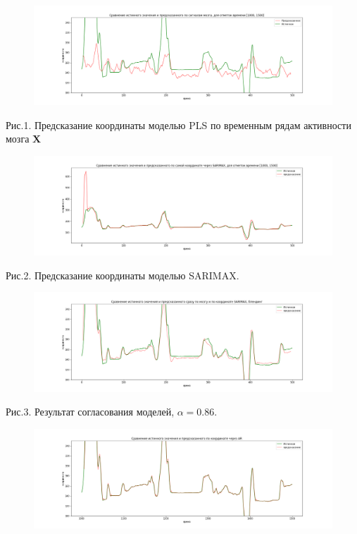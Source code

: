 \documentclass{article}
\begin{document}
\begin{figure}[H]
\includegraphics[scale=0.34]{images/1.png}
\end{figure}
Рис.1. Предсказание координаты моделью PLS по временным рядам активности мозга $\mathbf{X}$
\begin{figure}[H]
\includegraphics[scale=0.34]{images/2.png}
\end{figure}
Рис.2. Предсказание координаты моделью SARIMAX.
\begin{figure}[H]
\includegraphics[scale=0.34]{images/3.png}
\end{figure}
Рис.3. Результат согласования моделей, $\alpha = 0.86$.
\begin{figure}[H]
\includegraphics[scale=0.34]{images/4.png}
\end{figure}
\end{document}
